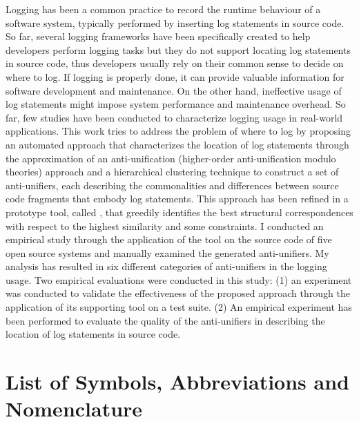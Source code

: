\documentclass{ucalgthes1}
\theoremstyle{plain}
\theoremstyle{definition}
\newcommand{\tool}{\relax}
\begin{document}
Logging has been a common practice to record the runtime behaviour of a software system, typically performed by inserting log statements in source code. So far, several logging frameworks have been specifically created to help developers perform logging tasks but they do not support locating log statements in source code, thus developers usually rely on their common sense to decide on where to log. If logging is properly done, it can provide valuable information for software development and maintenance. On the other hand, ineffective usage of log statements might impose system performance and maintenance overhead. So far, few studies have been conducted to characterize logging usage in real-world applications. This work tries to address the problem of where to log by proposing an automated approach that characterizes the location of log statements through the approximation of an anti-unification (higher-order anti-unification modulo theories) approach and a hierarchical clustering technique to construct a set of anti-unifiers, each describing the commonalities and differences between source code fragments that embody log statements. This approach has been refined in a prototype tool, called \tool{ELUS}, that greedily identifies the best structural correspondences with respect to the highest similarity and some constraints. I conducted an empirical study through the application of the tool on the source code of five open source systems and manually examined the generated anti-unifiers. My analysis has resulted in six different categories of anti-unifiers in the logging usage. Two empirical evaluations were conducted in this study: (1) an experiment was conducted to validate the effectiveness of the proposed approach through the application of its supporting tool on a test suite. (2) An empirical experiment has been performed to evaluate the quality of the anti-unifiers in describing the location of log statements in source code. 

\newpage
{}
{}


\begin{singlespace}
\newpage
{}
\tableofcontents
\pagestyle{plain}
\newpage
{}
\listoftables
\pagestyle{plain}
\newpage
{}
\listoffigures
\pagestyle{plain}
\clearpage
\clearpage          %
\end{singlespace}
\newpage
{}
\chapter*{\bf{List of Symbols, Abbreviations and Nomenclature}\hfill} 
\listofsymbols
\pagestyle{plain}
\clearpage
\end{document}
